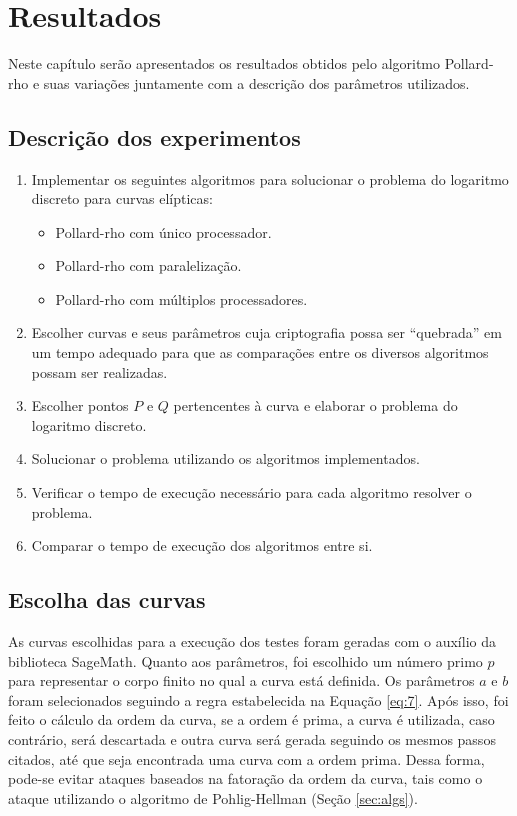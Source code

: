 \chapter{Resultados}
Neste capítulo serão apresentados os resultados obtidos pelo algoritmo Pollard-rho e suas variações juntamente com a descrição dos parâmetros utilizados.

\section{Descrição dos experimentos}
\begin{enumerate}

\item Implementar os seguintes algoritmos para solucionar o problema do logaritmo discreto para curvas elípticas:
  \begin{itemize}
  \item Pollard-rho com único processador.
  \item Pollard-rho com paralelização.
  \item Pollard-rho com múltiplos processadores.
  \end{itemize}
\item Escolher curvas e seus parâmetros cuja criptografia possa ser ``quebrada'' em um tempo adequado para que as comparações entre os diversos algoritmos possam ser realizadas.
\item Escolher pontos \(P\) e \(Q\) pertencentes à curva e elaborar o problema do logaritmo discreto.
\item Solucionar o problema utilizando os algoritmos implementados.
\item Verificar o tempo de execução necessário para cada algoritmo resolver o problema.
\item Comparar o tempo de execução dos algoritmos entre si.

\end{enumerate}

\section{Escolha das curvas}
As curvas escolhidas para a execução dos testes foram geradas com o auxílio da biblioteca SageMath. Quanto aos parâmetros, foi escolhido um número primo \(p\) para representar o corpo finito no qual a curva está definida. Os parâmetros \(a\) e \(b\) foram selecionados seguindo a regra estabelecida na Equação \ref{eq:7}. Após isso, foi feito o cálculo da ordem da curva, se a ordem é prima, a curva é utilizada, caso contrário, será descartada e outra curva será gerada seguindo os mesmos passos citados, até que seja encontrada uma curva com a ordem prima. Dessa forma, pode-se evitar ataques baseados na fatoração da ordem da curva, tais como o ataque utilizando o algoritmo de Pohlig-Hellman (Seção \ref{sec:algs}).

